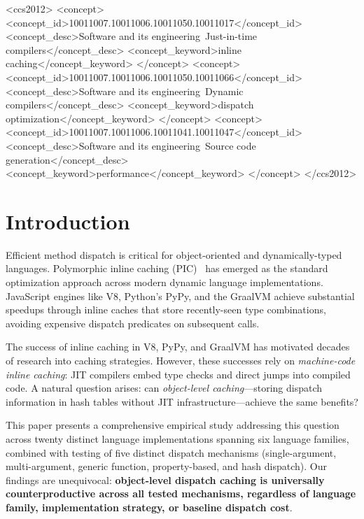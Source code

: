 \documentclass[sigplan,final]{acmart}
\begin{document}
\begin{CCSXML}
<ccs2012>
<concept>
<concept_id>10011007.10011006.10011050.10011017</concept_id>
<concept_desc>Software and its engineering~Just-in-time compilers</concept_desc>
<concept_keyword>inline caching</concept_keyword>
</concept>
<concept>
<concept_id>10011007.10011006.10011050.10011066</concept_id>
<concept_desc>Software and its engineering~Dynamic compilers</concept_desc>
<concept_keyword>dispatch optimization</concept_keyword>
</concept>
<concept>
<concept_id>10011007.10011006.10011041.10011047</concept_id>
<concept_desc>Software and its engineering~Source code generation</concept_desc>
<concept_keyword>performance</concept_keyword>
</concept>
</ccs2012>
\end{CCSXML}



\maketitle

\section{Introduction}

Efficient method dispatch is critical for object-oriented and dynamically-typed languages.
Polymorphic inline caching (PIC)~\cite{hoelzle1991optimizing} has emerged as the standard
optimization approach across modern dynamic language implementations. JavaScript engines like V8,
Python's PyPy, and the GraalVM achieve substantial speedups through inline caches that store
recently-seen type combinations, avoiding expensive dispatch predicates on subsequent calls.

The success of inline caching in V8, PyPy, and GraalVM has motivated decades of research into
caching strategies. However, these successes rely on \emph{machine-code inline caching}: JIT
compilers embed type checks and direct jumps into compiled code. A natural question arises: can
\emph{object-level caching}—storing dispatch information in hash tables without JIT
infrastructure—achieve the same benefits?

This paper presents a comprehensive empirical study addressing this question across twenty
distinct language implementations spanning six language families, combined with testing of five
distinct dispatch mechanisms (single-argument, multi-argument, generic function, property-based, and
hash dispatch). Our findings are unequivocal: \textbf{object-level dispatch caching is universally
counterproductive across all tested mechanisms, regardless of language family, implementation
strategy, or baseline dispatch cost}.
\end{document}
